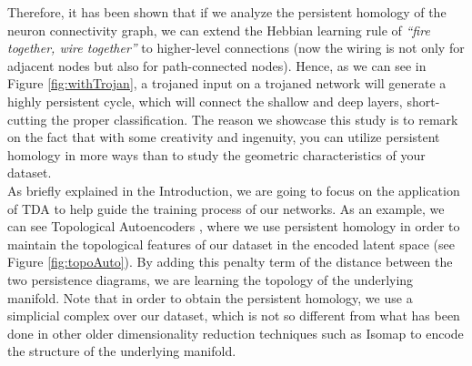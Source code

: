 \documentclass[../main.tex]{subfiles}
\begin{document}
Therefore, it has been shown that if we analyze the persistent homology of the neuron connectivity graph, we can extend the Hebbian learning rule of \textit{``fire together, wire together''} to higher-level connections (now the wiring is not only for adjacent nodes but also for path-connected nodes). Hence, as we can see in Figure \ref{fig:withTrojan}, a trojaned input on a trojaned network will generate a highly persistent cycle, which will connect the shallow and deep layers, short-cutting the proper classification. The reason we showcase this study is to remark on the fact that with some creativity and ingenuity, you can utilize persistent homology in more ways than to study the geometric characteristics of your dataset.\\

As briefly explained in the Introduction, we are going to focus on the application of TDA to help guide the training process of our networks. As an example, we can see Topological Autoencoders \cite{moor_topological_2021}, where we use persistent homology in order to maintain the topological features of our dataset in the encoded latent space (see Figure \ref{fig:topoAuto}). By adding this penalty term of the distance between the two persistence diagrams, we are learning the topology of the underlying manifold. Note that in order to obtain the persistent homology, we use a simplicial complex over our dataset, which is not so different from what has been done in other older dimensionality reduction techniques such as Isomap \cite{tenenbaum_global_2000} to encode the structure of the underlying manifold.  
\end{document}
